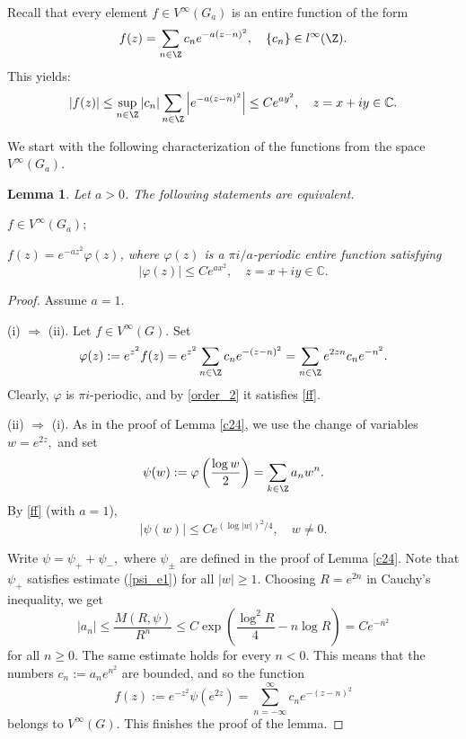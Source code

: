 \documentclass[12pt]{amsart}
\numberwithin{equation}{section}
\theoremstyle{plain}
\newtheorem{lemma}[theorem]{Lemma}
\theoremstyle{definition}
\newcommand{\Cc}{{\mathbb C}}
\begin{document}
Recall that every element $f\in V^\infty(G_a)$ is an entire function of the form
\begin{equation}\label{f}f(z)=\sum_{n\in\Z}c_ne^{-a(z-n)^2},\quad \{c_n\}\in l^\infty(\Z).\end{equation}This yields:
 \begin{equation}\label{order_2}
        |f(z)|\leq \sup_{n\in\Z}|c_n|\sum_{n\in\Z}\left|e^{-a(z-n)^2}\right|\leq Ce^{ay^2},\quad z=x+iy\in\mathbb{C}.
    \end{equation}

We start with the following characterization of the functions from the space $V^{\infty}(G_a).$ 
\begin{lemma}\label{gauss_char}
Let $a>0$. The following statements are equivalent.

    \item[$(i)$] $f\in V^\infty(G_a);$
    \item[$(ii)$] $f(z)=e^{-az^2}\varphi(z)$, where $\varphi(z)$ is a $\pi i/a$-periodic entire function satisfying  
\begin{equation}\label{ff}
    |\varphi(z)| \le C e^{ax^2}, \quad z = x + iy \in \Cc.
   \end{equation}

\end{lemma}

\begin{proof}
Assume $a=1.$


    (i) $\Rightarrow$ (ii). 
    Let $f\in V^\infty(G)$. Set
    $$
    \varphi(z): = e^{z^2}f(z)=e^{z^2} \sum \limits_{n \in \Z} c_n e^{-(z-n)^2} = \sum \limits_{n \in \Z} e^{2 z n} c_n e^{-n^2}.
    $$Clearly, $\varphi$ is $\pi i$-periodic, and by  \eqref{order_2} it satisfies \eqref{ff}.
    

   (ii) $\Rightarrow$ (i). As in the proof of Lemma \ref{c24}, we use the change of variables $w=e^{2z},$ and set $$\psi(w):=\varphi\left(\frac{\log w}{2}\right)=\sum_{k\in\Z}a_n w^n.$$    
By \eqref{ff} (with $a=1$), 
\begin{equation}\label{psi_e1}|\psi(w)|\leq C e^{(\log |w|)^2/4},\quad w\ne0. \end{equation}

Write $\psi=\psi_++\psi_-,$ where $\psi_\pm$ are defined in the proof  of Lemma \ref{c24}.
Note that $\psi_+$ satisfies estimate (\ref{psi_e1}) for all $|w|\geq 1$.
    Choosing $R=e^{2n}$ in Cauchy's inequality, we get
    $$|a_n|\leq \frac{M(R,\psi)}{R^n}\leq C\exp\left(\frac{\log^2 R}{4}-n\log R\right)=Ce^{-n^2}$$
     for all $n\geq0$.
    The same estimate holds for every $n<0.$ This means that the numbers $c_n:=a_ne^{n^2}$ are bounded, and so
the function
    $$f(z):=e^{-z^2}\psi(e^{2z})=\sum_{n=-\infty}^\infty c_ne^{-(z-n)^2}$$
    belongs to $V^\infty(G).$ This finishes the proof of the lemma.
\end{proof}
\end{document}
